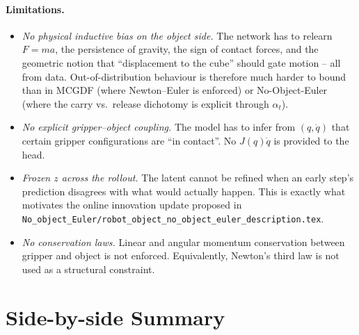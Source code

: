 \documentclass[11pt]{article}
\begin{document}
\paragraph{Limitations.}
\begin{itemize}
  \item \emph{No physical inductive bias on the object side.}  The
    network has to relearn $F=ma$, the persistence of gravity, the
    sign of contact forces, and the geometric notion that
    ``displacement to the cube'' should gate motion -- all from data.
    Out-of-distribution behaviour is therefore much harder to
    bound than in MCGDF (where Newton--Euler is enforced) or
    No-Object-Euler (where the carry vs.\ release dichotomy is
    explicit through $\alpha_t$).
  \item \emph{No explicit gripper--object coupling.}  The model has
    to infer from $(q, \dot q)$ that certain gripper configurations
    are ``in contact''.  No $J(q)\dot q$ is provided to the head.
  \item \emph{Frozen $z$ across the rollout.}  The latent cannot be
    refined when an early step's prediction disagrees with what would
    actually happen.  This is exactly what motivates the online
    innovation update proposed in
    \texttt{No\_object\_Euler/robot\_object\_no\_object\_euler\_description.tex}.
  \item \emph{No conservation laws.}  Linear and angular momentum
    conservation between gripper and object is not enforced.
    Equivalently, Newton's third law is not used as a structural
    constraint.
\end{itemize}

\section{Side-by-side Summary}
\end{document}
